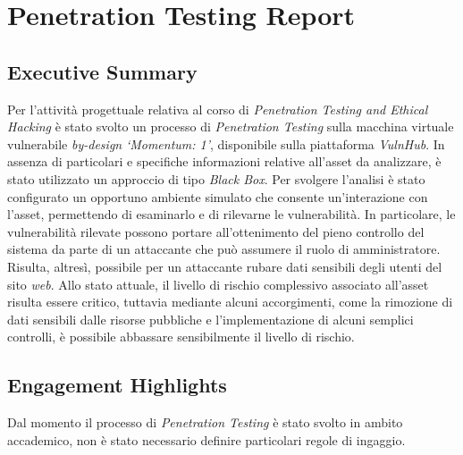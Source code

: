 \documentclass[a4paper,11pt,oneside,top=3cm,bottom=3cm,left=3.5cm,right=3.5cm,openright,reqno,table]{book}
\begin{document}


\frontmatter

\cleardoublepage



\mainmatter
\chapter{Penetration Testing Report}
\section{Executive Summary}
Per l'attività progettuale relativa al corso di \emph{Penetration Testing and Ethical Hacking} è stato svolto un processo di \emph{Penetration Testing} sulla macchina virtuale vulnerabile \emph{by-design} \emph{`Momentum: 1'}, disponibile sulla piattaforma \emph{VulnHub}. In assenza di particolari e specifiche informazioni relative all'asset da analizzare, è stato utilizzato un approccio di tipo \emph{Black Box}. Per svolgere l'analisi è stato configurato un opportuno ambiente simulato che consente un'interazione con l'asset, permettendo di esaminarlo e di rilevarne le vulnerabilità. In particolare, le vulnerabilità rilevate possono portare all'ottenimento del pieno controllo del sistema da parte di un attaccante che può assumere il ruolo di amministratore. Risulta, altresì, possibile per un attaccante rubare dati sensibili degli utenti del sito \emph{web}. Allo stato attuale, il livello di rischio complessivo associato all'asset risulta essere critico, tuttavia mediante alcuni accorgimenti, come la rimozione di dati sensibili dalle risorse pubbliche e l'implementazione di alcuni semplici controlli, è possibile abbassare sensibilmente il livello di rischio. 
\section{Engagement Highlights}
Dal momento il processo di \emph{Penetration Testing} è stato svolto in ambito accademico, non è stato necessario definire particolari regole di ingaggio. 
\end{document}
